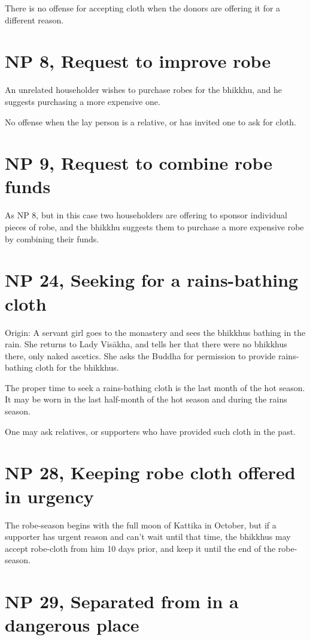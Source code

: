 There is no offense for accepting cloth when the donors are offering it
for a different reason.

\section{NP 8, Request to improve robe}

An unrelated householder wishes to purchase robes for the bhikkhu, and
he suggests purchasing a more expensive one.

No offense when the lay person is a relative, or has invited one to ask
for cloth.

\section{NP 9, Request to combine robe funds}

As NP 8, but in this case two householders are offering to sponsor
individual pieces of robe, and the bhikkhu suggests them to purchase a
more expensive robe by combining their funds.

\section{NP 24, Seeking for a rains-bathing cloth}

Origin: A servant girl goes to the monastery and sees the bhikkhus
bathing in the rain. She returns to Lady Visākha, and tells her that
there were no bhikkhus there, only naked ascetics. She asks the Buddha
for permission to provide rains-bathing cloth for the bhikkhus.

The proper time to seek a rains-bathing cloth is the last month of the
hot season. It may be worn in the last half-month of the hot season and
during the rains season.

One may ask relatives, or supporters who have provided such cloth in the
past.

\section{NP 28, Keeping robe cloth offered in urgency}

The robe-season begins with the full moon of Kattika in October, but if
a supporter has urgent reason and can't wait until that time, the
bhikkhus may accept robe-cloth from him 10 days prior, and keep it until
the end of the robe-season.

\section{NP 29, Separated from in a dangerous place}

